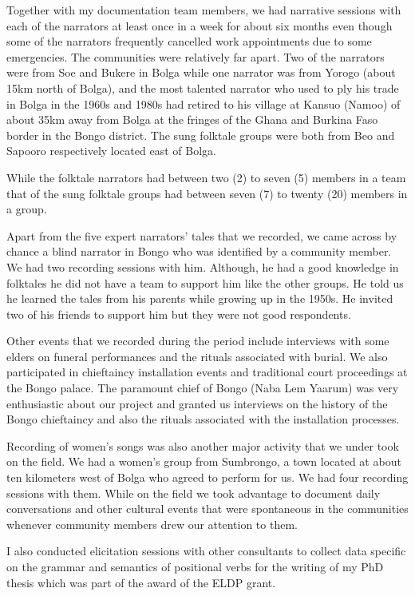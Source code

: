 \documentclass[output=paper,colorlinks,citecolor=brown]{langscibook}
\begin{document}
Together with my documentation team members, we had narrative sessions with each of the narrators at least once in a week for about six months even though some of the narrators frequently cancelled work appointments due to some emergencies. The communities were relatively far apart. Two of the narrators were from Soe and Bukere in Bolga while one narrator was from Yorogo (about 15km north of Bolga), and the most talented narrator who used to ply his trade in Bolga in the 1960s and 1980s had retired to his village at Kansuo (Namoo) of about 35km away from Bolga at the fringes of the Ghana and Burkina Faso border in the Bongo district. The sung folktale groups were both from Beo and Sapooro respectively located east of Bolga. 

While the folktale narrators had between two (2) to seven (5) members in a team that of the sung folktale groups had between seven (7) to twenty (20) members in a group.

Apart from the five expert narrators’ tales that we recorded, we came across by chance a blind narrator in Bongo who was identified by a community member. We had two recording sessions with him. Although, he had a good knowledge in folktales he did not have a team to support him like the other groups. He told us he learned the tales from his parents while growing up in the 1950s. He invited two of his friends to support him but they were not good respondents.

Other events that we recorded during the period include interviews with some elders on funeral performances and the rituals associated with burial. We also participated in chieftaincy installation events and traditional court proceedings at the Bongo palace. The paramount chief of Bongo (Naba Lem Yaarum) was very enthusiastic about our project and granted us interviews on the history of the Bongo chieftaincy and also the rituals associated with the installation processes. 

Recording of women’s songs was also another major activity that we under took on the field. We had a women’s group from Sumbrongo, a town located at about ten kilometers west of Bolga who agreed to perform for us. We had four recording sessions with them. While on the field we took advantage to document daily conversations and other cultural events that were spontaneous in the communities whenever community members drew our attention to them.

I also conducted elicitation sessions with other consultants to collect data specific on the grammar and semantics of positional verbs for the writing of my PhD thesis which was part of the award of the ELDP grant. 
\end{document}

